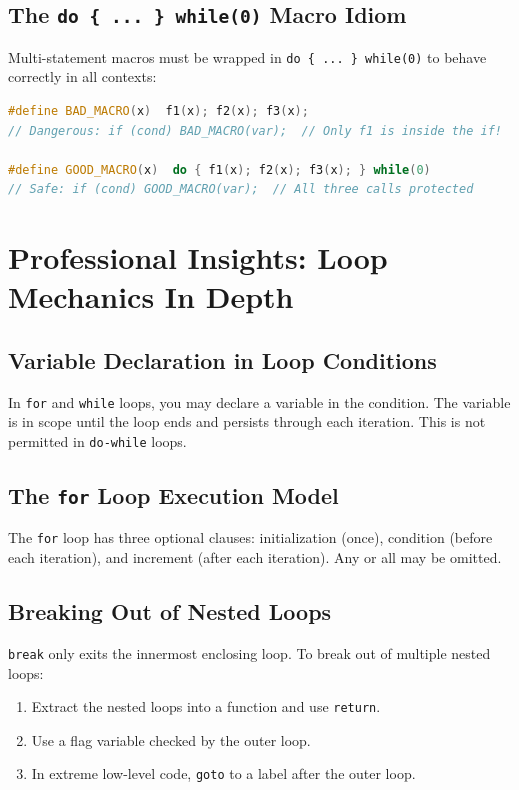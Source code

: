 \subsection{The \texttt{do \{ ... \} while(0)} Macro Idiom}

Multi-statement macros must be wrapped in \texttt{do \{ ... \} while(0)} to behave correctly in all contexts:

\begin{lstlisting}[language=C++, caption={Safe multi-statement macro}]
#define BAD_MACRO(x)  f1(x); f2(x); f3(x);
// Dangerous: if (cond) BAD_MACRO(var);  // Only f1 is inside the if!

#define GOOD_MACRO(x)  do { f1(x); f2(x); f3(x); } while(0)
// Safe: if (cond) GOOD_MACRO(var);  // All three calls protected
\end{lstlisting}

\section{Professional Insights: Loop Mechanics In Depth}
\label{sec:loop-mechanics}

\subsection{Variable Declaration in Loop Conditions}

In \texttt{for} and \texttt{while} loops, you may declare a variable in the condition. The variable is in scope until the loop ends and persists through each iteration. This is not permitted in \texttt{do-while} loops.

\subsection{The \texttt{for} Loop Execution Model}

The \texttt{for} loop has three optional clauses: initialization (once), condition (before each iteration), and increment (after each iteration). Any or all may be omitted.

\subsection{Breaking Out of Nested Loops}

\texttt{break} only exits the innermost enclosing loop. To break out of multiple nested loops:
\begin{enumerate}
    \item Extract the nested loops into a function and use \texttt{return}.
    \item Use a flag variable checked by the outer loop.
    \item In extreme low-level code, \texttt{goto} to a label after the outer loop.
\end{enumerate}

